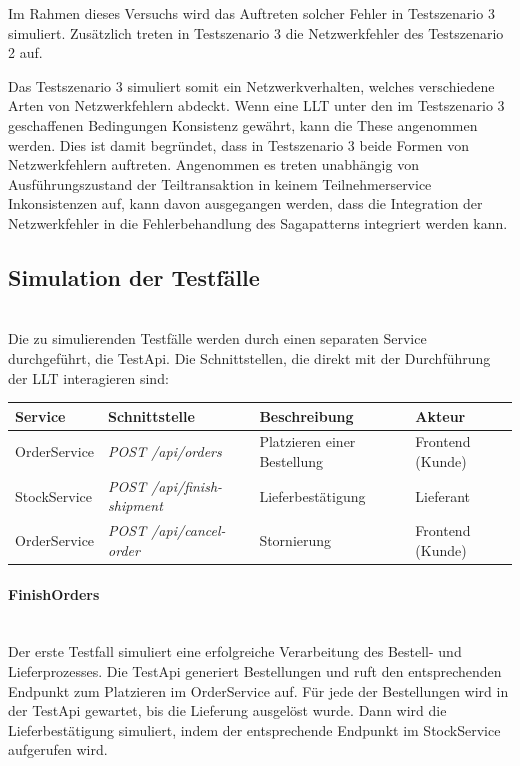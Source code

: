 Im Rahmen dieses Versuchs wird das Auftreten solcher Fehler in Testszenario 3 simuliert. Zusätzlich treten in Testszenario 3 die Netzwerkfehler des Testszenario 2 auf. 

Das Testszenario 3 simuliert somit ein Netzwerkverhalten, welches verschiedene Arten von Netzwerkfehlern abdeckt. Wenn eine LLT unter den im Testszenario 3 geschaffenen Bedingungen Konsistenz gewährt, kann die These angenommen werden. Dies ist damit begründet, dass in Testszenario 3 beide Formen von Netzwerkfehlern auftreten. Angenommen es treten unabhängig von Ausführungszustand der Teiltransaktion in keinem Teilnehmerservice Inkonsistenzen auf, kann davon ausgegangen werden, dass die Integration der Netzwerkfehler in die Fehlerbehandlung des Sagapatterns integriert werden kann.


\subsection{Simulation der Testfälle} \mbox{}\\
Die zu simulierenden Testfälle werden durch einen separaten Service durchgeführt, die TestApi. Die Schnittstellen, die direkt mit der Durchführung der LLT interagieren sind:

\begin{center}
	\begin{longtable}[h]{|p{2.3cm}|p{4.9cm}|p{3.2cm}|p{3.4cm}|}
		\hline
		Service & Schnittstelle & Beschreibung & Akteur \\ \hline
		OrderService & \textit{POST /api/orders} & Platzieren einer Bestellung & Frontend (Kunde) \\ \hline
		StockService & \textit{POST /api/finish-shipment} & Lieferbestätigung & Lieferant \\ \hline
		OrderService & \textit{POST /api/cancel-order} & Stornierung & Frontend (Kunde) \\ \hline
	\end{longtable}
\end{center}
\FloatBarrier

\paragraph*{FinishOrders} \mbox{}\\
Der erste Testfall simuliert eine erfolgreiche Verarbeitung des Bestell- und Lieferprozesses. Die TestApi generiert Bestellungen und ruft den entsprechenden Endpunkt zum Platzieren im OrderService auf. Für jede der Bestellungen wird in der TestApi gewartet, bis die Lieferung ausgelöst wurde. Dann wird die Lieferbestätigung simuliert, indem der entsprechende Endpunkt im StockService aufgerufen wird. 

